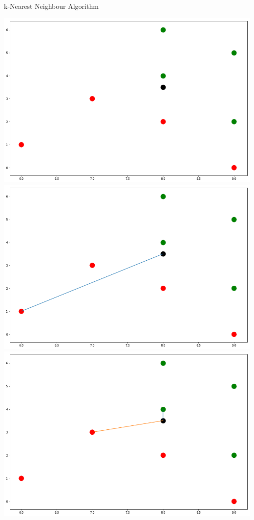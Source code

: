 \documentclass[a4paper]{scrartcl}
\begin{document}
\begin{multicols}{2}
\begin{algorithm}[H]
                            \caption{k-Nearest Neighbour Algorithm}
                           \end{algorithm}
                         \includegraphics[width=\linewidth]{nn1.png}
                         \includegraphics[width=\linewidth]{nn2.png}
                         \includegraphics[width=\linewidth]{knn2_b.png}

\end{multicols}
\end{document}
